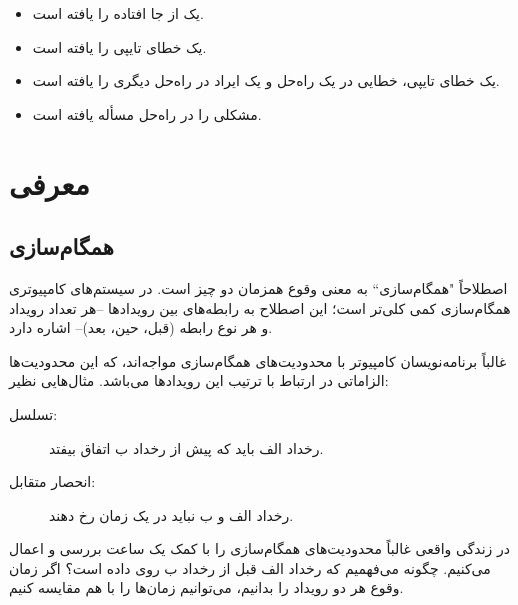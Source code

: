 \documentclass{book}
\newcommand{\clearemptydoublepage}{\newpage\cleardoublepage}
\newcommand{\myquote}[1]{"#1``}
\begin{document}
\begin{itemize}
\item {}
    یک  از جا افتاده را یافته است. 

\item {} یک خطای تایپی را یافته است. 

\item {}    یک خطای تایپی، خطایی در یک راه‌حل و یک ایراد در راه‌حل دیگری را یافته است. 

\item {} 
    مشکلی را در راه‌حل مسأله   یافته است. 

\end{itemize}


\tableofcontents
\clearemptydoublepage

\mainmatter


\chapter{معرفی}

\section{همگام‌‌سازی}
\label{synch}

اصطلاحاً \myquote{همگام‌سازی} به معنی وقوع همزمان دو چیز است. در سیستم‌های کامپیوتری همگام‌سازی کمی کلی‌تر است؛
    این اصطلاح به رابطه‌های بین رویدادها --هر تعداد رویداد و هر نوع رابطه (قبل، حین، بعد)-- اشاره دارد.
    
غالباً برنامه‌نویسان کامپیوتر با محدودیت‌های همگام‌سازی مواجه‌اند، که این محدودیت‌ها الزاماتی در ارتباط با ترتیب این رویدادها می‌باشد.
مثال‌هایی نظیر:

\begin{description}

\item%
    [تسلسل:] رخداد الف باید که پیش از رخداد ب اتفاق بیفتد. 

\item%
[انحصار متقابل:] رخداد الف و ب نباید در یک زمان رخ دهند.

\end{description}
    در زندگی واقعی غالباً محدودیت‌های همگام‌سازی را با کمک یک ساعت بررسی و اعمال می‌کنیم. 
    چگونه می‌‌فهمیم که رخداد الف قبل از رخداد ب روی داده است؟ اگر زمان وقوع هر دو رویداد را بدانیم، می‌توانیم زمان‌ها را با هم مقایسه کنیم.
    
\end{document}
